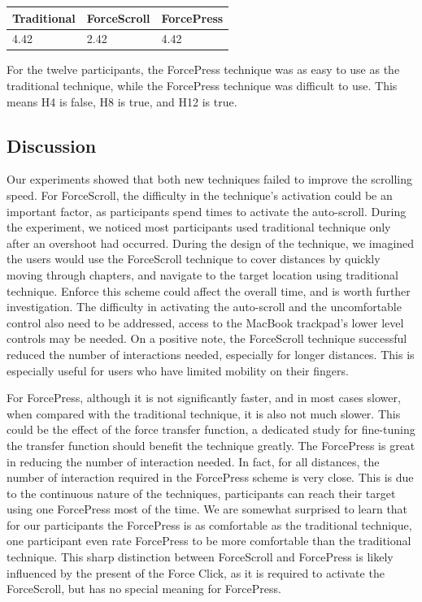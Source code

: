\documentclass{sigchi}
\begin{document}
\begin{table}[h]
	\begin{tabular}{|l|l|l|}
		\hline
		Traditional & ForceScroll & ForcePress \\ \hline
		4.42        & 2.42        & 4.42       \\ \hline
	\end{tabular}
\end{table}

For the twelve participants, the ForcePress technique was as easy to use as the traditional technique, while the ForcePress technique was difficult to use. This means H4 is false, H8 is true, and H12 is true.

\subsection{Discussion}
Our experiments showed that both new techniques failed to improve the scrolling speed. For ForceScroll, the difficulty in the technique's activation could be an important factor, as participants spend times to activate the auto-scroll. During the experiment, we noticed most participants used traditional technique only after an overshoot had occurred. During the design of the technique, we imagined the users would use the ForceScroll technique to cover distances by quickly moving through chapters, and navigate to the target location using traditional technique. Enforce this scheme could affect the overall time, and is worth further investigation. The difficulty in activating the auto-scroll and the uncomfortable control also need to be addressed, access to the MacBook trackpad's lower level controls may be needed. On a positive note, the ForceScroll technique successful reduced the number of interactions needed, especially for longer distances. This is especially useful for users who have limited mobility on their fingers.

For ForcePress, although it is not significantly faster, and in most cases slower, when compared with the traditional technique, it is also not much slower. This could be the effect of the force transfer function, a dedicated study for fine-tuning the transfer function should benefit the technique greatly. The ForcePress is great in reducing the number of interaction needed. In fact, for all distances, the number of interaction required in the ForcePress scheme is very close. This is due to the continuous nature of the techniques, participants can reach their target using one ForcePress most of the time. We are somewhat surprised to learn that for our participants the ForcePress is as comfortable as the traditional technique, one participant even rate ForcePress to be more comfortable than the traditional technique. This sharp distinction between ForceScroll and ForcePress is likely influenced by the present of the Force Click, as it is required to activate the ForceScroll, but has no special meaning for ForcePress.  
\end{document}
